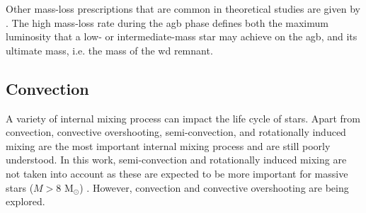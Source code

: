 Other mass-loss prescriptions that are common in theoretical studies are given by \cite{de1988mass,nieuwenhuijzen1990parametrization}. The high mass-loss rate during the \ac{agb} phase defines both the maximum luminosity that a low- or intermediate-mass star may achieve on the \ac{agb}, and its ultimate mass, i.e. the mass of the \ac{wd} remnant.

\subsection{Convection}\label{sec:convection}

A variety of internal mixing process can impact the life cycle of stars. Apart from convection, convective overshooting, semi-convection, and rotationally induced mixing are the most important internal mixing process \citep{schootemeijer2019constraining} and are still poorly understood. In this work, semi-convection and rotationally induced mixing are not taken into account as these are expected to be more important for massive stars ($M>8$ M$_{\odot}$) \citep{langer2012presupernova}. However, convection and convective overshooting are being explored.

